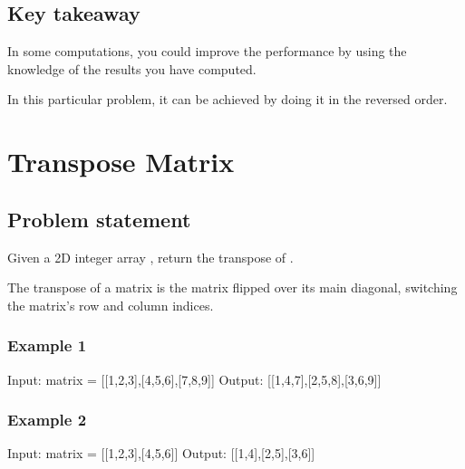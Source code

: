 \documentclass[letterpaper,12pt,english]{book}
\begin{document}
\subsection{Key takeaway}
\label{\detokenize{Array/01_ARR_739_Daily_Temperatures:key-takeaway}}
\sphinxAtStartPar
In some computations, you could improve the performance by using the knowledge of the results you have computed.

\sphinxAtStartPar
In this particular problem, it can be achieved by doing it in the reversed order.

\sphinxstepscope


\section{Transpose Matrix}
\label{\detokenize{Array/01_ARR_867_Transpose_Matrix:transpose-matrix}}\label{\detokenize{Array/01_ARR_867_Transpose_Matrix::doc}}

\subsection{Problem statement\sphinxfootnotemark[15]}
\label{\detokenize{Array/01_ARR_867_Transpose_Matrix:problem-statement}}%
\begin{footnotetext}[15]\sphinxAtStartFootnote
{}
%
\end{footnotetext}\ignorespaces 
\sphinxAtStartPar
Given a 2D integer array , return the transpose of .

\sphinxAtStartPar
The transpose of a matrix is the matrix flipped over its main diagonal, switching the matrix’s row and column indices.

\sphinxAtStartPar
{}


\subsubsection{Example 1}
\label{\detokenize{Array/01_ARR_867_Transpose_Matrix:example-1}}
\begin{sphinxVerbatim}[commandchars=\\\{\}]
Input: matrix = [[1,2,3],[4,5,6],[7,8,9]]
Output: [[1,4,7],[2,5,8],[3,6,9]]
\end{sphinxVerbatim}


\subsubsection{Example 2}
\label{\detokenize{Array/01_ARR_867_Transpose_Matrix:example-2}}
\begin{sphinxVerbatim}[commandchars=\\\{\}]
Input: matrix = [[1,2,3],[4,5,6]]
Output: [[1,4],[2,5],[3,6]]
\end{sphinxVerbatim}
\end{document}
